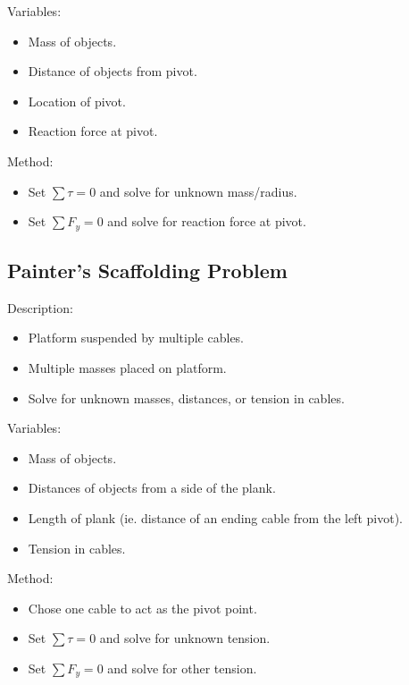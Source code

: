 \documentclass[a4paper,11pt]{report}
\begin{document}
Variables:

\begin{itemize}
\item Mass of objects.
\item Distance of objects from pivot.
\item Location of pivot.
\item Reaction force at pivot.
\end{itemize}

Method:

\begin{itemize}
\item Set $\sum \tau = 0$ and solve for unknown mass/radius.
\item Set $\sum F_y = 0$ and solve for reaction force at pivot.
\end{itemize}

\subsection{Painter's Scaffolding Problem}

Description:

\begin{itemize}
\item Platform suspended by multiple cables.
\item Multiple masses placed on platform.
\item Solve for unknown masses, distances, or tension in cables.
\end{itemize}

Variables:

\begin{itemize}
\item Mass of objects.
\item Distances of objects from a side of the plank.
\item Length of plank (ie. distance of an ending cable from the left pivot).
\item Tension in cables.
\end{itemize}

Method:

\begin{itemize}
\item Chose one cable to act as the pivot point.
\item Set $\sum \tau = 0$ and solve for unknown tension.
\item Set $\sum F_y = 0$ and solve for other tension.
\end{itemize}
\end{document}
